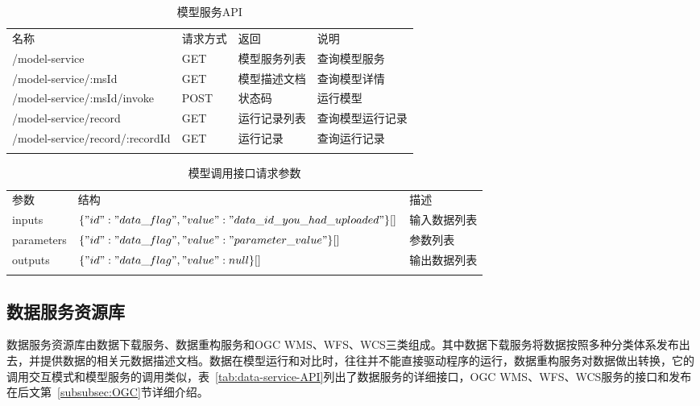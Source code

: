 \begin{table}[!htbp]
    \centering
    \caption{模型服务API}
    \label{tab:model-service-API}
    \begin{tabular}{llll}
        \Xhline{1.5pt}
        名称 & 请求方式 & 返回 & 说明 \\
        \Xhline{1.5pt}
        /model-service & GET & 模型服务列表 & 查询模型服务 \\
        /model-service/:msId & GET & 模型描述文档 & 查询模型详情 \\
        /model-service/:msId/invoke & POST & 状态码 & 运行模型 \\ 
        /model-service/record & GET & 运行记录列表 & 查询模型运行记录 \\
        /model-service/record/:recordId & GET & 运行记录 & 查询运行记录 \\
        \Xhline{1.5pt}
    \end{tabular}
\end{table}

\begin{table}[!htbp]
    \centering
    \caption{模型调用接口请求参数}
    \label{tab:model-invoke-API}
    \begin{tabular}{lll}
        \Xhline{1.5pt}
        参数 & 结构 & 描述 \\
        \Xhline{1.5pt}
        inputs 
        & 
        $\{ "id": "data\_flag", "value": "data\_id\_you\_had\_uploaded" \}[]$
        & 输入数据列表 \\
        parameters 
        &
        $\{ "id": "data\_flag", "value": "parameter\_value" \}[]$
        & 参数列表 \\
        outputs 
        &
        $\{ "id": "data\_flag", "value": null \}[]$
        & 输出数据列表 \\
        \Xhline{1.5pt}
    \end{tabular}
\end{table}

\subsection{数据服务资源库}
数据服务资源库由数据下载服务、数据重构服务和OGC WMS、WFS、WCS三类组成。其中数据下载服务将数据按照多种分类体系发布出去，并提供数据的相关元数据描述文档。数据在模型运行和对比时，往往并不能直接驱动程序的运行，数据重构服务对数据做出转换，它的调用交互模式和模型服务的调用类似，表~\ref{tab:data-service-API}列出了数据服务的详细接口，OGC WMS、WFS、WCS服务的接口和发布在后文第~\ref{subsubsec:OGC}节详细介绍。

